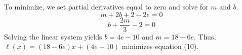 \documentclass[11pt]{article}
\theoremstyle{definition}
\newcommand{\1}[1]{\mathbf{1} \left \{ #1 \right \}}
\begin{document}
To minimize, we set partial derivatives equal to zero and solve for $m$ and $b$.
\[m + 2b + 2 - 2e = 0\]
\[b + \frac{2m}{3} - 2 = 0\]
Solving the linear system yields \(b = 4e - 10 \text{ and } m = 18 - 6e.\) Thus, \(\ell(x) = (18-6e)x + (4e-10)\) minimizes equation (10).
\end{document}

